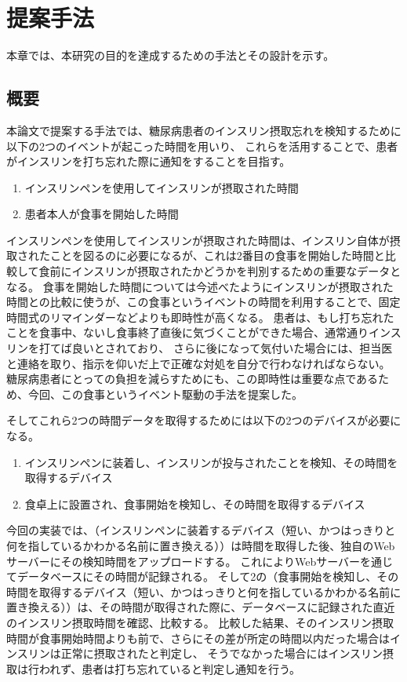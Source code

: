\chapter{提案手法}
\label{chap:design}

本章では、本研究の目的を達成するための手法とその設計を示す。

\section{概要}

本論文で提案する手法では、糖尿病患者のインスリン摂取忘れを検知するために以下の2つのイベントが起こった時間を用いり、
これらを活用することで、患者がインスリンを打ち忘れた際に通知をすることを目指す。

\begin{enumerate}
  \item インスリンペンを使用してインスリンが摂取された時間
  \item 患者本人が食事を開始した時間
\end{enumerate}

インスリンペンを使用してインスリンが摂取された時間は、インスリン自体が摂取されたことを図るのに必要になるが、これは2番目の食事を開始した時間と比較して食前にインスリンが摂取されたかどうかを判別するための重要なデータとなる。
食事を開始した時間については今述べたようにインスリンが摂取された時間との比較に使うが、この食事というイベントの時間を利用することで、固定時間式のリマインダーなどよりも即時性が高くなる。
患者は、もし打ち忘れたことを食事中、ないし食事終了直後に気づくことができた場合、通常通りインスリンを打てば良いとされており、\cite{insulin_qa_sakaemachi_nishi} \cite{insulin_qa_akaike}
さらに後になって気付いた場合には、担当医と連絡を取り、指示を仰いだ上で正確な対処を自分で行わなければならない。\cite{insulin_qa_senior}
糖尿病患者にとっての負担を減らすためにも、この即時性は重要な点であるため、今回、この食事というイベント駆動の手法を提案した。

そしてこれら2つの時間データを取得するためには以下の2つのデバイスが必要になる。

\begin{enumerate}
  \item インスリンペンに装着し、インスリンが投与されたことを検知、その時間を取得するデバイス
  \item 食卓上に設置され、食事開始を検知し、その時間を取得するデバイス
\end{enumerate}

今回の実装では、（インスリンペンに装着するデバイス（短い、かつはっきりと何を指しているかわかる名前に置き換える））は時間を取得した後、独自のWebサーバーにその検知時間をアップロードする。
これによりWebサーバーを通じてデータベースにその時間が記録される。
そして2の（食事開始を検知し、その時間を取得するデバイス（短い、かつはっきりと何を指しているかわかる名前に置き換える））は、その時間が取得された際に、データベースに記録された直近のインスリン摂取時間を確認、比較する。
比較した結果、そのインスリン摂取時間が食事開始時間よりも前で、さらにその差が所定の時間以内だった場合はインスリンは正常に摂取されたと判定し、
そうでなかった場合にはインスリン摂取は行われず、患者は打ち忘れていると判定し通知を行う。

